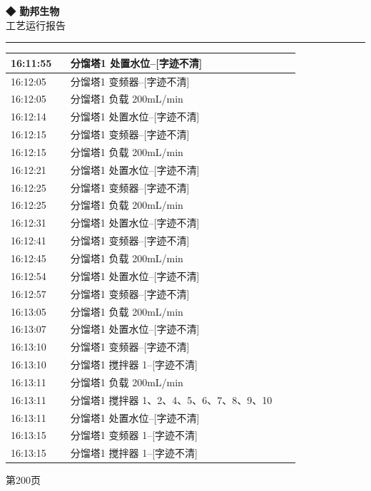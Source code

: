 \documentclass[UTF8,10pt,a4paper,fontset=fandol]{ctexart}
\begin{document}
\hfill
\begin{minipage}[t]{0.47\linewidth}
\centering
\textbf{◆ 勤邦生物}\\[2pt]
工艺运行报告\\[-2pt]
\rule{\linewidth}{0.4pt}

\scriptsize
\begin{tabular}{|p{0.19\linewidth}|p{0.73\linewidth}|}
\hline
16:11:55 & 分馏塔1 处置水位--[字迹不清] \\ \hline
16:12:05 & 分馏塔1 变频器--[字迹不清] \\ \hline
16:12:05 & 分馏塔1 负载 200mL/min \\ \hline
16:12:14 & 分馏塔1 处置水位--[字迹不清] \\ \hline
16:12:15 & 分馏塔1 变频器--[字迹不清] \\ \hline
16:12:15 & 分馏塔1 负载 200mL/min \\ \hline
16:12:21 & 分馏塔1 处置水位--[字迹不清] \\ \hline
16:12:25 & 分馏塔1 变频器--[字迹不清] \\ \hline
16:12:25 & 分馏塔1 负载 200mL/min \\ \hline
16:12:31 & 分馏塔1 处置水位--[字迹不清] \\ \hline
16:12:41 & 分馏塔1 变频器--[字迹不清] \\ \hline
16:12:45 & 分馏塔1 负载 200mL/min \\ \hline
16:12:54 & 分馏塔1 处置水位--[字迹不清] \\ \hline
16:12:57 & 分馏塔1 变频器--[字迹不清] \\ \hline
16:13:05 & 分馏塔1 负载 200mL/min \\ \hline
16:13:07 & 分馏塔1 处置水位--[字迹不清] \\ \hline
16:13:10 & 分馏塔1 变频器--[字迹不清] \\ \hline
16:13:10 & 分馏塔1 搅拌器 1--[字迹不清] \\ \hline
16:13:11 & 分馏塔1 负载 200mL/min \\ \hline
16:13:11 & 分馏塔1 搅拌器 1、2、4、5、6、7、8、9、10 \\ \hline
16:13:11 & 分馏塔1 处置水位--[字迹不清] \\ \hline
16:13:15 & 分馏塔1 变频器 1--[字迹不清] \\ \hline
16:13:15 & 分馏塔1 搅拌器 1--[字迹不清] \\ \hline
\end{tabular}

\vspace{2pt}
{\tiny 第200页}
\end{minipage}
\end{document}
